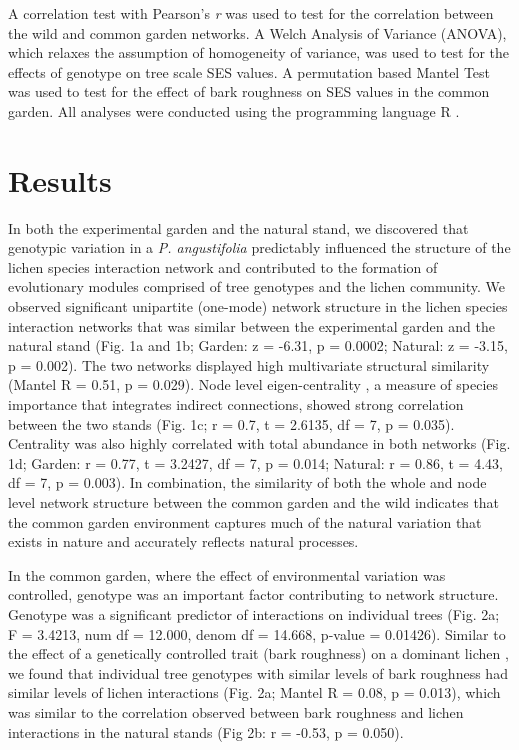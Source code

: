 \documentclass[fleqn,10pt]{wlscirep}
\begin{document}
A correlation test with Pearson’s \textit{r} was used to test for the
correlation between the wild and common garden networks. A Welch
Analysis of Variance (ANOVA), which relaxes the assumption of
homogeneity of variance, was used to test for the effects of genotype
on tree scale SES values. A permutation based Mantel Test was used to
test for the effect of bark roughness on SES values in the common
garden. All analyses were conducted using the programming language R
\cite{RCoreTeam2017}.



\section*{Results}


In both the experimental garden and the natural stand, we discovered
that genotypic variation in a \textit{P. angustifolia} predictably
influenced the structure of the lichen species interaction network and
contributed to the formation of evolutionary modules comprised of tree
genotypes and the lichen community.  We observed significant
unipartite (one-mode) network structure \cite{Araujo2011} in the
lichen species interaction networks that was similar between the
experimental garden and the natural stand (Fig. 1a and 1b; Garden: z =
-6.31, p = 0.0002; Natural: z = -3.15, p = 0.002). The two networks
displayed high multivariate structural similarity (Mantel R = 0.51, p
= 0.029). Node level eigen-centrality \cite{DeAngelis1989}, a measure
of species importance that integrates indirect connections, showed
strong correlation between the two stands (Fig. 1c; r = 0.7, t =
2.6135, df = 7, p = 0.035). Centrality was also highly correlated with
total abundance in both networks (Fig. 1d; Garden: r = 0.77, t =
3.2427, df = 7, p = 0.014; Natural:  r = 0.86, t = 4.43, df = 7, p =
0.003). In combination, the similarity of both the whole and node
level network structure between the common garden and the wild
indicates that the common garden environment captures much of the
natural variation that exists in nature and accurately reflects
natural processes.

In the common garden, where the effect of environmental variation was
controlled, genotype was an important factor contributing to network
structure. Genotype was a significant predictor of interactions on
individual trees (Fig. 2a; F = 3.4213, num df = 12.000, denom df =
14.668, p-value = 0.01426). Similar to the effect of a genetically
controlled trait (bark roughness) on a dominant lichen
\cite{Ellison2005}, we found that individual tree genotypes with
similar levels of bark roughness had similar levels of lichen
interactions (Fig. 2a; Mantel R = 0.08, p = 0.013), which was similar
to the correlation observed between bark roughness and lichen
interactions in the natural stands (Fig 2b: r = -0.53, p = 0.050).
\end{document}
